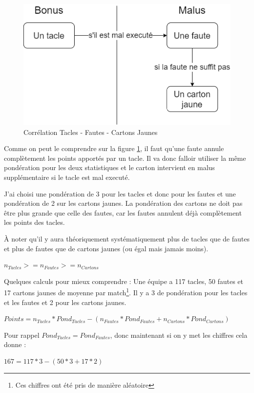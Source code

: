 \documentclass[a4paper,14pt]{extarticle}
\begin{document}
{\begin{figure}[H]
    \centering
    \includegraphics[width=15cm]{../img/schemaTacleFaute.png}
    \caption{Corrélation Tacles - Fautes - Cartons Jaunes}
    \label{fig:correlationTacleFaute}
\end{figure}

Comme on peut le comprendre sur la figure \ref{fig:correlationTacleFaute}, il faut qu'une faute annule complètement les points apportés par un tacle. Il va donc falloir utiliser la même pondération pour les deux statistiques et le carton intervient en malus supplémentaire si le tacle est mal executé.

J'ai choisi une pondération de 3 pour les tacles et donc pour les fautes et une pondération de 2 sur les cartons jaunes. La pondération des cartons ne doit pas être plus grande que celle des fautes, car les fautes annulent déjà complètement les points des tacles. 

À noter qu'il y aura théoriquement systématiquement plus de tacles que de fautes et plus de fautes que de cartons jaunes (ou égal mais jamais moins).

$n_{Tacles} >= n_{Fautes} >= n_{Cartons}  $

Quelques calculs pour mieux comprendre :
Une équipe a 117 tacles, 50 fautes et 17 cartons jaunes de moyenne par match\footnote{Ces chiffres ont été pris de manière aléatoire}. Il y a 3 de pondération pour les tacles et les fautes et 2 pour les cartons jaunes.

$Points = n_{Tacles} * Pond_{Tacles} - (n_{Fautes} * Pond_{Fautes} + n_{Cartons} * Pond_{Cartons})$ 


Pour rappel $Pond_{Tacles}=Pond_{Fautes}$, donc maintenant si on y met les chiffres cela donne : 

$167 = 117 * 3 - (50 * 3 + 17 * 2)$

}
\end{document}
